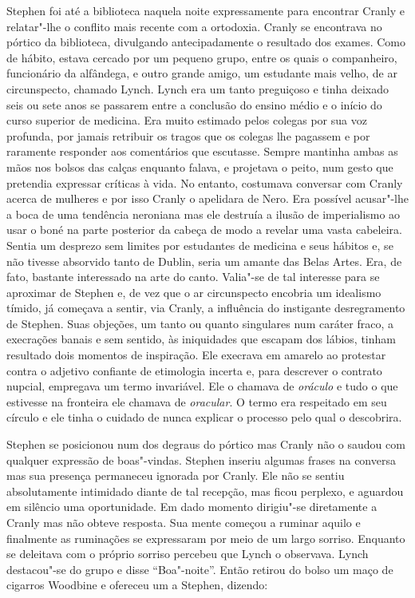 Stephen foi até a biblioteca naquela noite expressamente para encontrar Cranly
e relatar"-lhe o conflito mais recente com a ortodoxia.  Cranly se
encontrava no pórtico da biblioteca, divulgando antecipadamente o resultado dos
exames.  Como de hábito, estava cercado por um pequeno grupo, entre os quais o
companheiro, funcionário da alfândega, e outro grande amigo, um estudante mais
velho, de ar circunspecto, chamado Lynch.  Lynch era um tanto preguiçoso e
tinha deixado seis ou sete anos se passarem entre a conclusão do ensino médio e
o início do curso superior de medicina.  Era muito estimado pelos colegas por
sua voz profunda, por jamais retribuir os tragos que os colegas lhe pagassem e
por raramente responder aos comentários que escutasse.  Sempre mantinha ambas
as \label{maos"-nos} mãos nos bolsos das calças enquanto falava, e projetava o peito, num gesto
que pretendia expressar críticas à vida.  No entanto, costumava conversar com
Cranly acerca de mulheres e por isso Cranly o apelidara de Nero.  Era possível
acusar"-lhe a boca de uma tendência neroniana mas ele destruía a ilusão de
imperialismo ao usar o boné na parte posterior da cabeça de modo a revelar uma
vasta cabeleira.  Sentia um desprezo sem limites por estudantes de medicina e
seus hábitos e, se não tivesse absorvido tanto de Dublin, seria um amante das
Belas Artes.  Era, de fato, bastante interessado na arte do canto.
Valia"-se de tal interesse para se aproximar de Stephen e, de vez que o ar
circunspecto encobria um \label{idealismo"-timido} idealismo tímido, já começava a sentir, via Cranly,
a influência do instigante desregramento de Stephen.  Suas objeções, um tanto
ou quanto singulares num caráter fraco, a execrações banais e sem sentido, às
\label{iniquidades"-que} iniquidades que escapam dos lábios, tinham resultado dois momentos de
inspiração.  Ele \label{execrava"-em} execrava em amarelo ao protestar contra o adjetivo confiante
de etimologia incerta e, para descrever o contrato nupcial, empregava um termo
invariável.  Ele o chamava de \textit{oráculo} e tudo o que estivesse na
fronteira ele chamava de \textit{oracular}.  O termo era respeitado em seu
círculo e ele tinha o cuidado de nunca explicar o processo pelo qual o
descobrira.

Stephen se posicionou num dos degraus do pórtico mas Cranly não o saudou com
qualquer expressão de boas"-vindas.  Stephen inseriu algumas frases na conversa
mas sua presença permaneceu \label{ignorada"-por} ignorada por Cranly.  Ele não se sentiu
absolutamente intimidado diante de tal recepção, mas ficou perplexo, e aguardou
em silêncio uma oportunidade.  Em dado momento dirigiu"-se diretamente a Cranly
mas não obteve resposta.  Sua mente começou a ruminar aquilo e finalmente as
ruminações se expressaram por meio de um largo sorriso.  Enquanto se deleitava
com o próprio sorriso percebeu que Lynch o observava.  Lynch destacou"-se do
grupo e disse “Boa"-noite”.  Então retirou do bolso um maço de cigarros Woodbine
e ofereceu um a Stephen, dizendo:

